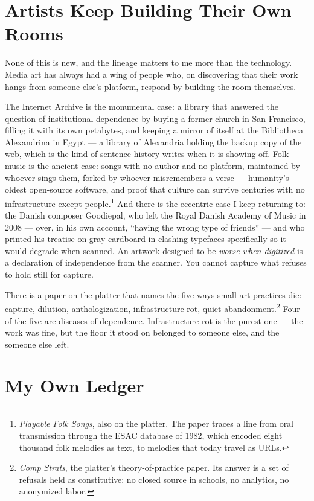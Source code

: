 \documentclass[11pt,letterpaper]{article}
\begin{document}
\section{Artists Keep Building Their Own Rooms}

None of this is new, and the lineage matters to me more than the technology. Media art has always had a wing of people who, on discovering that their work hangs from someone else's platform, respond by building the room themselves.

The Internet Archive is the monumental case: a library that answered the question of institutional dependence by buying a former church in San Francisco, filling it with its own petabytes, and keeping a mirror of itself at the Bibliotheca Alexandrina in Egypt --- a library of Alexandria holding the backup copy of the web, which is the kind of sentence history writes when it is showing off. Folk music is the ancient case: songs with no author and no platform, maintained by whoever sings them, forked by whoever misremembers a verse --- humanity's oldest open-source software, and proof that culture can survive centuries with no infrastructure except people.\footnote{\textit{Playable Folk Songs}, also on the platter. The paper traces a line from oral transmission through the ESAC database of 1982, which encoded eight thousand folk melodies as text, to melodies that today travel as URLs.} And there is the eccentric case I keep returning to: the Danish composer Goodiepal, who left the Royal Danish Academy of Music in 2008 --- over, in his own account, ``having the wrong type of friends'' --- and who printed his treatise on gray cardboard in clashing typefaces specifically so it would degrade when scanned. An artwork designed to be \textit{worse when digitized} is a declaration of independence from the scanner. You cannot capture what refuses to hold still for capture.

There is a paper on the platter that names the five ways small art practices die: capture, dilution, anthologization, infrastructure rot, quiet abandonment.\footnote{\textit{Comp Strats}, the platter's theory-of-practice paper. Its answer is a set of refusals held as constitutive: no closed source in schools, no analytics, no anonymized labor.} Four of the five are diseases of dependence. Infrastructure rot is the purest one --- the work was fine, but the floor it stood on belonged to someone else, and the someone else left.

\section{My Own Ledger}
\end{document}
